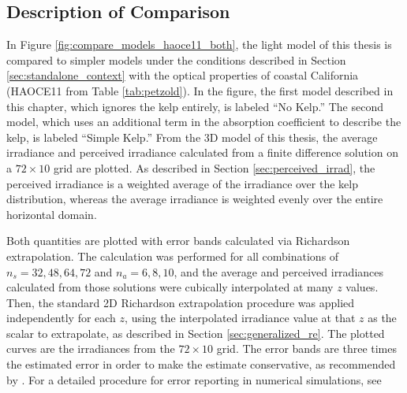 \subsection{Description of Comparison}
In Figure \ref{fig:compare_models_haoce11_both}, the light model of this thesis is compared to simpler models under the conditions described in Section \ref{sec:standalone_context} with the optical properties of coastal California (HAOCE11 from Table \ref{tab:petzold}).
In the figure, the first model described in this chapter, which ignores the kelp entirely, is labeled ``No Kelp.''
The second model, which uses an additional term in the absorption coefficient to describe the kelp, is labeled ``Simple Kelp.''
From the 3D model of this thesis, the average irradiance and perceived irradiance calculated from a finite difference solution on a $72\times10$ grid are plotted.
As described in Section \ref{sec:perceived_irrad}, the perceived irradiance is a weighted average of the irradiance over the kelp distribution, whereas the average irradiance is weighted evenly over the entire horizontal domain.

Both quantities are plotted with error bands calculated via Richardson extrapolation.
The calculation was performed for all combinations of $n_s=32,48,64,72$ and $n_a=6,8,10$, and the average and perceived irradiances calculated from those solutions were cubically interpolated at many $z$ values.
Then, the standard 2D Richardson extrapolation procedure was applied independently for each $z$, using the interpolated irradiance value at that $z$ as the scalar to extrapolate, as described in Section \ref{sec:generalized_re}.
The plotted curves are the irradiances from the $72\times 10$ grid.
The error bands are three times the estimated error in order to make the estimate conservative, as recommended by \cite{roache_perspective_1994}.
For a detailed procedure for error reporting in numerical simulations, see \cite{noauthor_procedure_2008}

